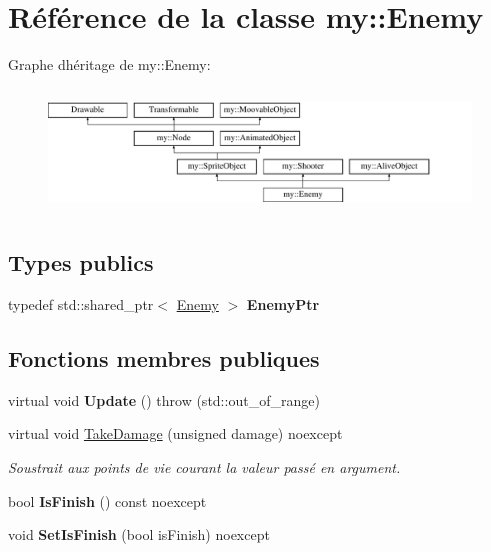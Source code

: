 \hypertarget{classmy_1_1Enemy}{}\section{Référence de la classe my\+:\+:Enemy}
\label{classmy_1_1Enemy}
Graphe d\textquotesingle{}héritage de my\+:\+:Enemy\+:\begin{figure}[H]
\begin{center}
\leavevmode
\includegraphics[height=3.318518cm]{classmy_1_1Enemy}
\end{center}
\end{figure}
\subsection*{Types publics}
\begin{DoxyCompactItemize}
\item 
\mbox{\label{classmy_1_1Enemy_a641a329df8e8ebbe703e7dfe81968ba3}} 
typedef std\+::shared\+\_\+ptr$<$ \hyperlink{classmy_1_1Enemy}{Enemy} $>$ {\bfseries Enemy\+Ptr}
\end{DoxyCompactItemize}
\subsection*{Fonctions membres publiques}
\begin{DoxyCompactItemize}
\item 
\mbox{\label{classmy_1_1Enemy_ae6f0f34e1aedd39a7b6b1d59dc15d9ec}} 
virtual void {\bfseries Update} ()  throw (std\+::out\+\_\+of\+\_\+range)
\item 
virtual void \hyperlink{classmy_1_1Enemy_a38251585de243212ad04d5bbc2843f50}{Take\+Damage} (unsigned damage) noexcept
\begin{DoxyCompactList}\small\item\em Soustrait aux points de vie courant la valeur passé en argument. \end{DoxyCompactList}\item 
\mbox{\label{classmy_1_1Enemy_a0cc3f61e52ef9de7902d81e6be6be3ff}} 
bool {\bfseries Is\+Finish} () const noexcept
\item 
\mbox{\label{classmy_1_1Enemy_a627abffea3eda8d0e849523452faf20b}} 
void {\bfseries Set\+Is\+Finish} (bool is\+Finish) noexcept
\end{DoxyCompactItemize}
